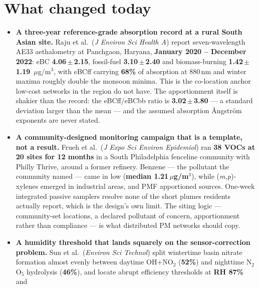 \documentclass[10pt]{article}
\begin{document}
\vspace{3mm}


\section*{\sffamily\bfseries\color{Deep}What changed today}
\vspace{-1.5mm}{\color{Amber}\rule{\linewidth}{1.1pt}}\vspace{2.5mm}

\footnotesize
\begin{itemize}
\item \textbf{A three-year reference-grade absorption record at a rural South Asian site.}
Raju et al.\ (\textit{J Environ Sci Health A}) report seven-wavelength AE33 aethalometry at
Panchgaon, Haryana, \textbf{January 2020 -- December 2022}: eBC \textbf{4.06\,$\pm$\,2.15},
fossil-fuel \textbf{3.10\,$\pm$\,2.40} and biomass-burning \textbf{1.42\,$\pm$\,1.19}\,%
$\mu$g/m$^3$, with eBCff carrying \textbf{68\%} of absorption at 880\,nm and winter maxima
roughly double the monsoon minima. This is the co-location anchor low-cost networks in the
region do not have. The apportionment itself is shakier than the record: the
eBCff/eBCbb ratio is \textbf{3.02\,$\pm$\,3.80} --- a standard deviation larger than the
mean --- and the assumed absorption \AA ngstr\"om exponents are never stated.
\item \textbf{A community-designed monitoring campaign that is a template, not a result.}
Frueh et al.\ (\textit{J Expo Sci Environ Epidemiol}) ran \textbf{38 VOCs at 20 sites for
12 months} in a South Philadelphia fenceline community with Philly Thrive, around a former
refinery. Benzene --- the pollutant the community named --- came in low
(\textbf{median 1.21\,$\mu$g/m$^3$}), while (\textit{m,p})-xylenes emerged in industrial
areas, and PMF apportioned sources. One-week integrated passive samplers resolve none of
the short plumes residents actually report, which is the design's own limit. The siting
logic --- community-set locations, a declared pollutant of concern, apportionment rather
than compliance --- is what distributed PM networks should copy.
\item \textbf{A humidity threshold that lands squarely on the sensor-correction problem.}
Sun et al.\ (\textit{Environ Sci Technol}) split wintertime basin nitrate formation almost
evenly between daytime OH+NO$_2$ (\textbf{52\%}) and nighttime N$_2$O$_5$ hydrolysis
(\textbf{46\%}), and locate abrupt efficiency thresholds at \textbf{RH 87\%} and

\end{itemize}
\end{document}
